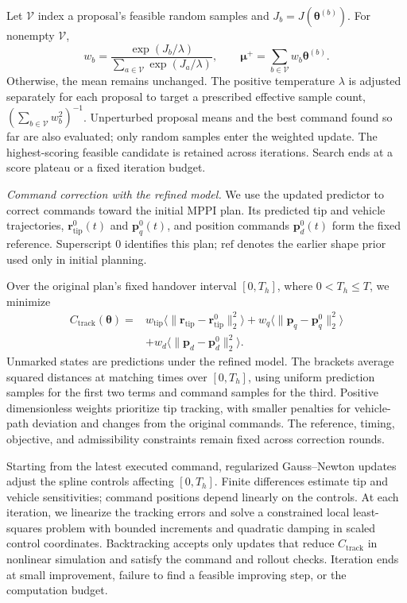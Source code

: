 \documentclass[letterpaper, 10 pt, conference]{ieeeconf}
\begin{document}
Let $\mathcal V$ index a proposal's feasible random samples and
$J_b=J(\boldsymbol\theta^{(b)})$. For nonempty $\mathcal V$,
\begin{equation}
w_b=\frac{\exp(J_b/\lambda)}{\sum_{a\in\mathcal V}\exp(J_a/\lambda)},
\qquad
\boldsymbol\mu^+=\sum_{b\in\mathcal V}w_b\boldsymbol\theta^{(b)}.
\label{eq:offline_sampling_update}
\end{equation}
Otherwise, the mean remains unchanged. The positive temperature
$\lambda$ is adjusted separately for each proposal to target a
prescribed effective sample count,
$(\sum_{b\in\mathcal V}w_b^2)^{-1}$.
Unperturbed proposal means and the best command found so far
are also evaluated; only random samples enter the weighted update.
The highest-scoring feasible candidate is retained across iterations.
Search ends at a score plateau or a fixed iteration budget.

\noindent\emph{Command correction with the refined model.}
We use the updated predictor to correct commands toward the
initial MPPI plan. Its predicted tip and vehicle trajectories,
$\mathbf r_{\mathrm{tip}}^0(t)$ and $\mathbf p_q^0(t)$,
and position commands $\mathbf p_d^0(t)$ form the fixed reference.
Superscript $0$ identifies this plan; $\mathrm{ref}$ denotes
the earlier shape prior used only in initial planning.

Over the original plan's fixed handover interval $[0,T_h]$,
where $0<T_h\leq T$, we minimize
\begin{equation}
\begin{aligned}
C_{\mathrm{track}}(\boldsymbol\theta)
={}&w_{\mathrm{tip}}\bigl\langle\|\mathbf r_{\mathrm{tip}}-\mathbf r_{\mathrm{tip}}^0\|_2^2\bigr\rangle
+w_q\bigl\langle\|\mathbf p_q-\mathbf p_q^0\|_2^2\bigr\rangle\\
&+w_d\bigl\langle\|\mathbf p_d-\mathbf p_d^0\|_2^2\bigr\rangle.
\end{aligned}
\label{eq:reference_tracking_cost}
\end{equation}
Unmarked states are predictions under the refined model.
The brackets average squared distances at matching times over
$[0,T_h]$, using uniform prediction samples for the first two
terms and command samples for the third. Positive dimensionless
weights prioritize tip tracking, with smaller penalties for
vehicle-path deviation and changes from the original commands.
The reference, timing, objective, and admissibility constraints
remain fixed across correction rounds.

Starting from the latest executed command, regularized
Gauss--Newton updates adjust the spline controls affecting
$[0,T_h]$. Finite differences estimate tip and vehicle sensitivities;
command positions depend linearly on the controls. At each iteration,
we linearize the tracking errors and solve a constrained local
least-squares problem with bounded increments and quadratic
damping in scaled control coordinates. Backtracking accepts only
updates that reduce $C_{\mathrm{track}}$ in nonlinear simulation
and satisfy the command and rollout checks. Iteration ends at
small improvement, failure to find a feasible improving step,
or the computation budget.
\end{document}
